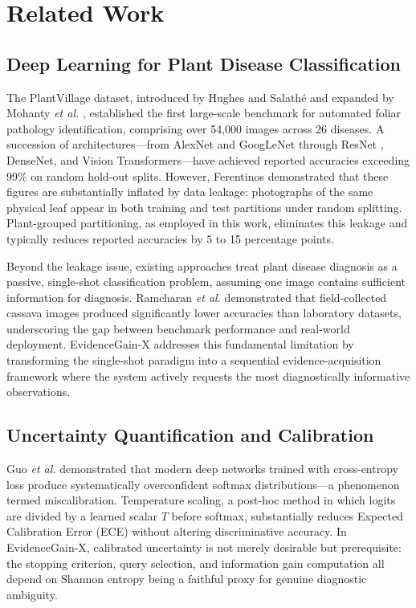 \documentclass[conference]{IEEEtran}
\begin{document}
\section{Related Work}

\subsection{Deep Learning for Plant Disease Classification}
The PlantVillage dataset, introduced by Hughes and Salath\'e \cite{hughes2015} and expanded by Mohanty \textit{et al.} \cite{mohanty2016}, established the first large-scale benchmark for automated foliar pathology identification, comprising over 54,000 images across 26 diseases. A succession of architectures---from AlexNet and GoogLeNet through ResNet \cite{he2016}, DenseNet, and Vision Transformers---have achieved reported accuracies exceeding 99\% on random hold-out splits. However, Ferentinos \cite{ferentinos2018} demonstrated that these figures are substantially inflated by data leakage: photographs of the same physical leaf appear in both training and test partitions under random splitting. Plant-grouped partitioning, as employed in this work, eliminates this leakage and typically reduces reported accuracies by 5 to 15 percentage points.

Beyond the leakage issue, existing approaches treat plant disease diagnosis as a passive, single-shot classification problem, assuming one image contains sufficient information for diagnosis. Ramcharan \textit{et al.} \cite{ramcharan2017} demonstrated that field-collected cassava images produced significantly lower accuracies than laboratory datasets, underscoring the gap between benchmark performance and real-world deployment. EvidenceGain-X addresses this fundamental limitation by transforming the single-shot paradigm into a sequential evidence-acquisition framework where the system actively requests the most diagnostically informative observations.

\subsection{Uncertainty Quantification and Calibration}
Guo \textit{et al.} \cite{guo2017} demonstrated that modern deep networks trained with cross-entropy loss produce systematically overconfident softmax distributions---a phenomenon termed miscalibration. Temperature scaling, a post-hoc method in which logits are divided by a learned scalar $T$ before softmax, substantially reduces Expected Calibration Error (ECE) without altering discriminative accuracy. In EvidenceGain-X, calibrated uncertainty is not merely desirable but prerequisite: the stopping criterion, query selection, and information gain computation all depend on Shannon entropy being a faithful proxy for genuine diagnostic ambiguity.
\end{document}
